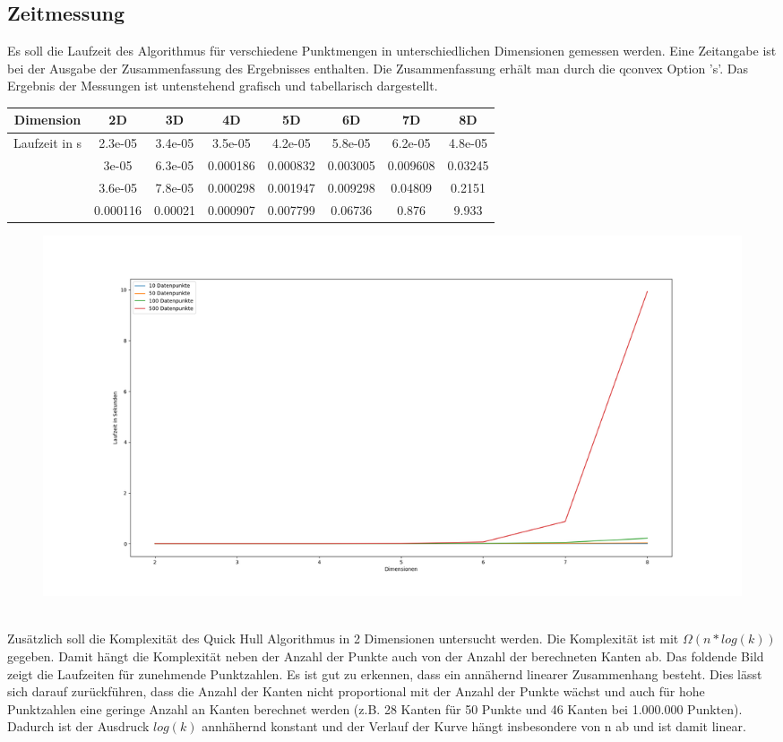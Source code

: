 \documentclass[12pt]{scrartcl}
\begin{document}
\subsection{Zeitmessung}
Es soll die Laufzeit des Algorithmus für verschiedene Punktmengen in unterschiedlichen Dimensionen gemessen werden.  Eine Zeitangabe ist bei der Ausgabe der Zusammenfassung des Ergebnisses enthalten. Die Zusammenfassung erhält man durch die qconvex Option 's'. Das Ergebnis der Messungen ist untenstehend grafisch und tabellarisch dargestellt.
\begin{center}
\begin{tabular}{||c | c c c c c c c||} 
    \hline
    Dimension & 2D &       3D &      4D &       5D &       6D &       7D &       8D      \\
    \hline \hline
    \multirow{4}{*}{Laufzeit in s} & 2.3e-05 &  3.4e-05 & 3.5e-05 &  4.2e-05 &  5.8e-05 &  6.2e-05 &  4.8e-05 \\ \cline{2-8}
                                   & 3e-05 &    6.3e-05 & 0.000186 & 0.000832 & 0.003005 & 0.009608 & 0.03245 \\ \cline{2-8}
                                   & 3.6e-05 &  7.8e-05 & 0.000298 & 0.001947 & 0.009298 & 0.04809 &  0.2151  \\ \cline{2-8}
                                   & 0.000116 & 0.00021 & 0.000907 & 0.007799 & 0.06736 &  0.876 &    9.933   \\ \hline
\end{tabular}
\end{center}

\begin{figure}[H]
    \centering
    \includegraphics[scale=0.32]{runtimes.png}
\end{figure}

\ \\ 
Zusätzlich soll die Komplexität des Quick Hull Algorithmus in 2 Dimensionen untersucht werden.
Die Komplexität ist mit $\Omega(n*log(k))$ gegeben. Damit hängt die Komplexität neben der Anzahl der Punkte auch von der Anzahl der berechneten Kanten ab.  
Das foldende Bild zeigt die Laufzeiten für zunehmende Punktzahlen. Es ist gut zu erkennen, dass ein annähernd linearer Zusammenhang besteht. Dies lässt sich darauf zurückführen, dass die Anzahl der Kanten nicht proportional mit der Anzahl der Punkte wächst und auch für hohe Punktzahlen eine geringe Anzahl an Kanten berechnet werden (z.B. 28 Kanten für 50 Punkte und 46 Kanten bei 1.000.000 Punkten). Dadurch ist der Ausdruck $log(k)$ annhähernd konstant und der Verlauf der Kurve hängt insbesondere von n ab und ist damit linear.
\end{document}
